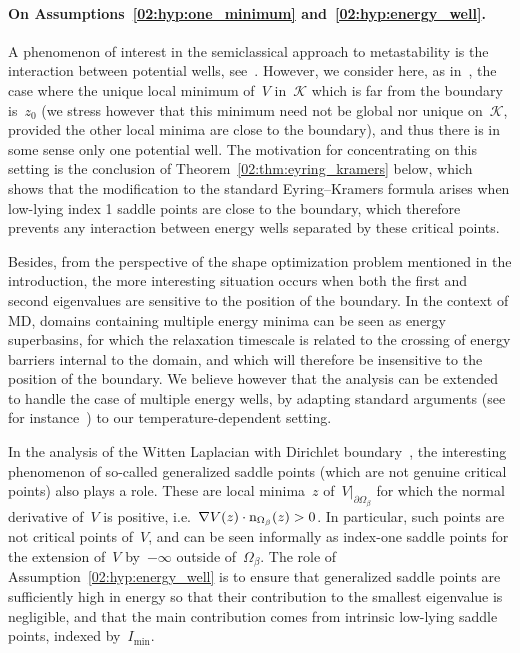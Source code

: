     \paragraph{On Assumptions~\eqref{02:hyp:one_minimum} and~\eqref{02:hyp:energy_well}.}
    A phenomenon  of interest in the semiclassical approach to metastability is the interaction between potential wells, see~\cite{HS85,DS99,HKN04,BGK05,LN15,LLPN22}. However, we consider here, as in~\cite{DGLLPN19}, the case where the unique local minimum of~$V$ in~$\mathcal K$ which is far from the boundary is~$z_0$ (we stress however that this minimum need not be global nor unique on~$\mathcal K$, provided the other local minima are close to the boundary), and thus there is in some sense only one potential well.
    The motivation for concentrating on this setting is the conclusion of Theorem~\ref{02:thm:eyring_kramers} below, which shows that the modification to the standard Eyring--Kramers formula arises when low-lying index 1 saddle points are close to the boundary, which therefore prevents any interaction between energy wells separated by these critical points.

    Besides, from the perspective of the shape optimization problem mentioned in the introduction, the more interesting situation occurs when both the first and second eigenvalues are sensitive to the position of the boundary. In the context of MD, domains containing multiple energy minima can be seen as energy superbasins, for which the relaxation timescale is related to the crossing of energy barriers internal to the domain, and which will therefore be insensitive to the position of the boundary.
    We believe however that the analysis can be extended to handle the case of multiple energy wells, by adapting standard arguments (see for instance~\cite{LPN21}) to our temperature-dependent setting.

    In the analysis of the Witten Laplacian with Dirichlet boundary~\cite{HN06,LN15,DGLLPN19,LPN21}, the interesting phenomenon of so-called generalized saddle points (which are not genuine critical points) also plays a role. These are local minima~$z$ of~$V|_{\partial \Omega_\beta}$ for which the normal derivative of~$V$ is positive, i.e.~$\nabla V(z)\cdot \mathrm{n}_{\Omega_\beta}(z) > 0$. In particular, such points are not critical points of~$V$, and can be seen informally as index-one saddle points for the extension of~$V$ by~$-\infty$ outside of~$\Omega_\beta$.
    The role of Assumption~\eqref{02:hyp:energy_well} is to ensure that generalized saddle points are sufficiently high in energy so that their contribution to the smallest eigenvalue is negligible, and that the main contribution comes from intrinsic low-lying saddle points, indexed by~$I_{\min}$.

